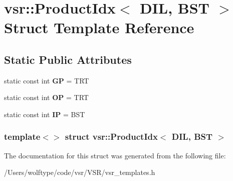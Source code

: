 \hypertarget{structvsr_1_1_product_idx_3_01_d_i_l_00_01_b_s_t_01_4}{\section{vsr\-:\-:Product\-Idx$<$ D\-I\-L, B\-S\-T $>$ Struct Template Reference}
\label{structvsr_1_1_product_idx_3_01_d_i_l_00_01_b_s_t_01_4}
}
\subsection*{Static Public Attributes}
\begin{DoxyCompactItemize}
\item 
\hypertarget{structvsr_1_1_product_idx_3_01_d_i_l_00_01_b_s_t_01_4_ad219953c3afe1cb7d22fbc891ac61e00}{static const int {\bfseries G\-P} = T\-R\-T}\label{structvsr_1_1_product_idx_3_01_d_i_l_00_01_b_s_t_01_4_ad219953c3afe1cb7d22fbc891ac61e00}

\item 
\hypertarget{structvsr_1_1_product_idx_3_01_d_i_l_00_01_b_s_t_01_4_acac0edc95bba8a6faaba89707d994505}{static const int {\bfseries O\-P} = T\-R\-T}\label{structvsr_1_1_product_idx_3_01_d_i_l_00_01_b_s_t_01_4_acac0edc95bba8a6faaba89707d994505}

\item 
\hypertarget{structvsr_1_1_product_idx_3_01_d_i_l_00_01_b_s_t_01_4_a52292da7754d3047764d69c7015d0272}{static const int {\bfseries I\-P} = B\-S\-T}\label{structvsr_1_1_product_idx_3_01_d_i_l_00_01_b_s_t_01_4_a52292da7754d3047764d69c7015d0272}

\end{DoxyCompactItemize}
\subsubsection*{template$<$$>$ struct vsr\-::\-Product\-Idx$<$ D\-I\-L, B\-S\-T $>$}



The documentation for this struct was generated from the following file\-:\begin{DoxyCompactItemize}
\item 
/\-Users/wolftype/code/vsr/\-V\-S\-R/vsr\-\_\-templates.\-h\end{DoxyCompactItemize}
